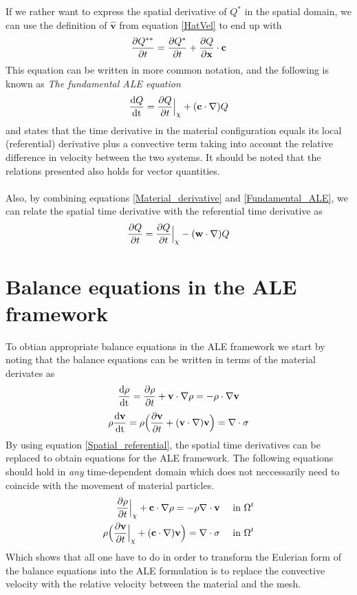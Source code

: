 If we rather want to express the spatial derivative of $Q^*$ in the spatial domain, we can use the definition of $\mathbf{\hat{v}}$ from equation \eqref{HatVel} to end up with
\begin{align}
\frac{\partial Q^{**}}{\partial t} = \frac{\partial Q^*}{\partial t} + \frac{\partial Q}{\partial \mathbf{x}} \cdot \mathbf{c}
\end{align}
This equation can be written in more common notation, and the following is known as \textit{The fundamental ALE equation}
\begin{align}
\frac{\mathrm{d}Q}{\mathrm{dt}} = \frac{\partial Q}{\partial t}\Big{|}_{\chi} + (\mathbf{c} \cdot \nabla) Q \label{Fundamental_ALE}
\end{align}
and states that the time derivative in the material configuration equals its local (referential) derivative plus a convective term taking into account the relative difference in velocity between the two systems. It should be noted that the relations presented also holds for vector quantities. 
\\
\\
Also, by combining equations \eqref{Material_derivative} and \eqref{Fundamental_ALE}, we can relate the spatial time derivative with the referential time derivative as
\begin{align}
\frac{\partial Q}{\partial t} = \frac{\partial Q}{\partial t}\Big{|}_{\chi} - (\mathbf{w} \cdot \nabla) Q \label{Spatial_referential}
\end{align}



\section{Balance equations in the ALE framework}
To obtian appropriate balance equations in the ALE framework we start by noting that the balance equations can be written in terms of the material derivates as
\begin{align}
\frac{\mathrm{d}\rho}{\mathrm{dt}} = \frac{\partial \rho}{\partial t} + \mathbf{v} \cdot \nabla \rho= -  \rho \cdot \nabla \mathbf{v}
\end{align}
\begin{align}
\rho \frac{\mathrm{d}\mathbf{v}}{\mathrm{dt}} = \rho \Big{(} \frac{\partial \mathbf{v}}{\partial t} + (\mathbf{v} \cdot \nabla ) \mathbf{v} \Big{)} = \nabla \cdot \sigma
\end{align}
By using equation \eqref{Spatial_referential}, the spatial time derivatives can be replaced to obtain equations for the ALE framework. The following equations should hold in \textit{any} time-dependent domain which does not neccessarily need to coincide with the movement of material particles. 
\begin{align}
\frac{\partial \rho}{\partial t}\Big{|}_\chi + \mathbf{c} \cdot \nabla \rho= -  \rho \nabla \cdot \mathbf{v} \quad \text{ in } \Omega^t \\
\rho \Big{(} \frac{\partial \mathbf{v}}{\partial t}\Big{|}_\chi + (\mathbf{c} \cdot \nabla ) \mathbf{v} \Big{)} = \nabla \cdot \sigma \quad \text{ in } \Omega^t
\end{align}
Which shows that all one have to do in order to transform the Eulerian form of the balance equations into the ALE formulation is to replace the convective velocity with the relative velocity between the material and the mesh. 
